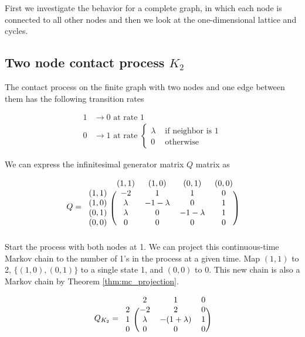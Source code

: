 First we investigate the behavior for a complete graph, in which each node is connected to all other nodes and then we look at the one-dimensional lattice and cycles.


\subsection{Two node contact process \texorpdfstring{$K_2$}{K2}}

The contact process on the finite graph with two nodes and one edge between them has the following transition rates

\begin{align*}
    1 &\to 0 \text{ at rate } 1\\
    0 &\to 1 \text{ at rate } \begin{cases}
        \lambda & \text{ if neighbor is 1}\\
        0 & \text{ otherwise}
    \end{cases}
\end{align*}

We can express the infinitesimal generator matrix $Q$ matrix as

$$
Q = \begin{blockarray}{ccccc}
    & (1,1) & (1,0) & (0,1) & (0,0)\\
    \begin{block}{c(cccc)}
        (1,1) & -2 & 1 & 1 & 0\\
        (1,0) & \lambda & - 1 - \lambda & 0 & 1\\
        (0,1) & \lambda & 0 & - 1 - \lambda & 1\\
        (0,0) & 0 & 0 & 0 & 0\\
    \end{block}
\end{blockarray}
$$
Start the process with both nodes at 1.
We can project this continuous-time Markov chain to the number of 1's in the process at a given time.
Map $(1,1)$ to 2, $\{(1,0),(0,1)\}$ to a single state 1, and $(0,0)$ to 0.
This new chain is also a Markov chain by Theorem \ref{thm:mc_projection}.

\begin{equation}\label{eq:q_c_2}
Q_{K_2} = \begin{blockarray}{cccc}
    & 2 & 1 & 0\\
    \begin{block}{c(ccc)}
        2 & -2 & 2 & 0\\
        1 & \lambda & - (1 + \lambda) & 1\\
        0 & 0 & 0 & 0\\
    \end{block}
\end{blockarray}
\end{equation}


